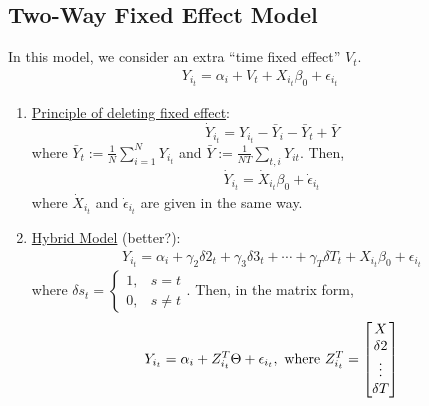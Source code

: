 \documentclass[11pt]{elegantbook}
\begin{document}
\subsection{Two-Way Fixed Effect Model}
In this model, we consider an extra ``time fixed effect'' $V_t$.
\begin{equation}
    \begin{aligned}
        Y_{i_t}=\alpha_i+V_t+X_{i_t}\beta_0+\epsilon_{i_t}
    \end{aligned}
    \nonumber
\end{equation}
\begin{enumerate}
    \item \underline{Principle of deleting fixed effect}: $$\dot{Y}_{i_t}=Y_{i_t}-\bar{Y}_i-\bar{Y}_t+\bar{Y}$$
    where $\bar{Y}_t:=\frac{1}{N}\sum_{i=1}^N Y_{i_t}$ and $\bar{Y}:=\frac{1}{NT}\sum_{t,i} Y_{it}$. Then,
    \begin{equation}
        \begin{aligned}
            \dot{Y}_{i_t}=\dot{X}_{i_t}\beta_0+\dot{\epsilon}_{i_t}
        \end{aligned}
        \nonumber
    \end{equation}
    where $\dot{X}_{i_t}$ and $\dot{\epsilon}_{i_t}$ are given in the same way.
    \item \underline{Hybrid Model} (better?):
    \begin{equation}
        \begin{aligned}
            Y_{i_t}=\alpha_i+\gamma_2\delta 2_t+\gamma_3\delta 3_t+\cdots +\gamma_T\delta T_t+X_{i_t}\beta_0+\epsilon_{i_t}
        \end{aligned}
        \nonumber
    \end{equation}
    where $\delta s_t=\left\{\begin{matrix}
        1,&s=t\\
        0,&s\neq t
    \end{matrix}\right.$. Then, in the matrix form,
    \begin{equation}
        \begin{aligned}
            Y_{i_t}=\alpha_i+Z_{i_t}^T\Theta+\epsilon_{i_t}, \textnormal{ where }Z_{i_t}^T=\begin{bmatrix}
                X\\
                \delta 2\\
                \vdots\\
                \delta T
            \end{bmatrix}
        \end{aligned}
        \nonumber
    \end{equation}
\end{enumerate}
\end{document}

